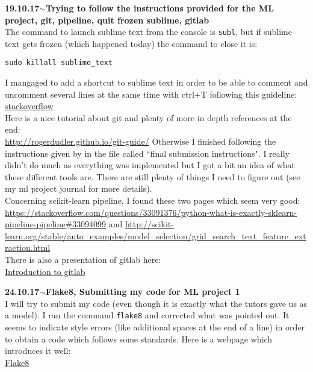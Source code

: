 \documentclass[11pt,a4paper]{article}
\newenvironment{loggentry}[2]%
{\noindent\textbf{#1}\hspace{1cm}$\mathbf{\sim}$\text{ }\textbf{#2}\\}{\vspace{0.5cm}}
\begin{document}
\begin{loggentry}{19.10.17}{Trying to follow the instructions provided for the ML project, git, pipeline, quit frozen sublime, gitlab}
The command to launch sublime text from the console is \texttt{subl}, but if sublime text gets frozen (which happened today) the command to close it is:
\begin{verbatim}
sudo killall sublime_text
\end{verbatim}
I mangaged to add a shortcut to sublime text in order to be able to comment and uncomment several lines at the same time with ctrl+T following this guideline:\\
\href{https://stackoverflow.com/questions/11598840/keyboard-shortcut-to-comment-lines-in-sublime-text-2}{stackoverflow}\\
Here is a nice tutorial about git and plenty of more in depth references at the end:\\
\url{http://rogerdudler.github.io/git-guide/}
Otherwise I finished following the instructions given by in the file called ``final submission instructions". I really didn't do much as everything was implemented but I got a bit an idea of what these different tools are. There are still plenty of things I need to figure out (see my ml project journal for more details).\\
Concerning scikit-learn pipeline, I found these two pages which seem very good:\\
\url{https://stackoverflow.com/questions/33091376/python-what-is-exactly-sklearn-pipeline-pipeline#33094099}
and
\url{http://scikit-learn.org/stable/auto_examples/model_selection/grid_search_text_feature_extraction.html}\\
There is also a presentation of gitlab here:\\
\href{https://docs.gitlab.com/ee/user/project/members/index.html#request-access-to-a-project}{Introduction to gitlab}
\end{loggentry}

\begin{loggentry}{24.10.17}{Flake8, Submitting my code for ML project 1}
I will try to submit my code (even though it is exactly what the tutors gave us as a model). I ran the command \texttt{flake8} and corrected what was pointed out. It seems to indicate style errors (like additional spaces at the end of a line) in order to obtain a code which follows some standards. Here is a webpage which introduces it well:\\
\href{https://medium.com/python-pandemonium/what-is-flake8-and-why-we-should-use-it-b89bd78073f2}{Flake8}
\end{loggentry}
\end{document}

